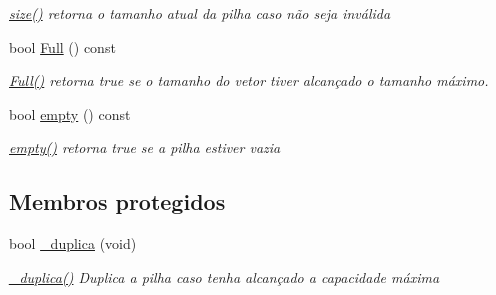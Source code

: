 \begin{DoxyCompactItemize}
\begin{DoxyCompactList}\small\item\em \hyperlink{class_pilha_a0be3922eb0539ff4d010c1b41e196f80}{size()} retorna o tamanho atual da pilha caso não seja inválida \end{DoxyCompactList}\item 
bool \hyperlink{class_pilha_a2ecae3a17ec78595e03939204d130299}{Full} () const 
\begin{DoxyCompactList}\small\item\em \hyperlink{class_pilha_a2ecae3a17ec78595e03939204d130299}{Full()} retorna true se o tamanho do vetor tiver alcançado o tamanho máximo. \end{DoxyCompactList}\item 
bool \hyperlink{class_pilha_aeeca565b873e7e92f2634efe7205ea8c}{empty} () const 
\begin{DoxyCompactList}\small\item\em \hyperlink{class_pilha_aeeca565b873e7e92f2634efe7205ea8c}{empty()} retorna true se a pilha estiver vazia \end{DoxyCompactList}\end{DoxyCompactItemize}
\subsection*{Membros protegidos}
\begin{DoxyCompactItemize}
\item 
bool \hyperlink{class_pilha_a8a46d91706060300be9b7b9718c9d867}{\-\_\-duplica} (void)
\begin{DoxyCompactList}\small\item\em \hyperlink{class_pilha_a8a46d91706060300be9b7b9718c9d867}{\-\_\-duplica()} Duplica a pilha caso tenha alcançado a capacidade máxima \end{DoxyCompactList}\end{DoxyCompactItemize}

